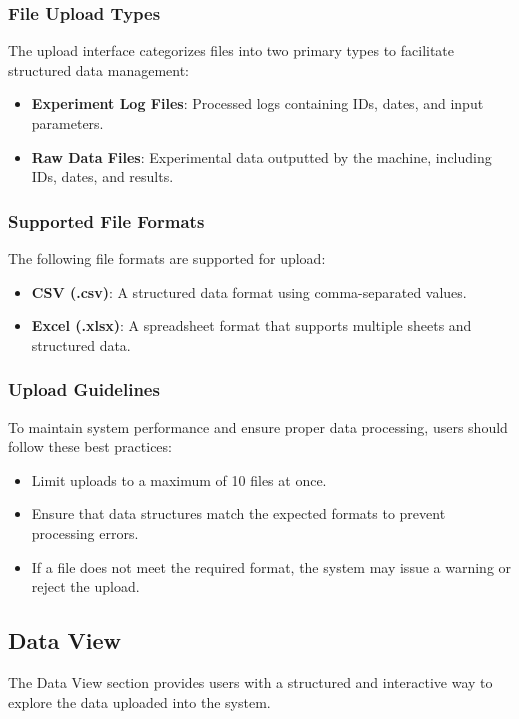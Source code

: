 \documentclass[12pt]{article}
\begin{document}
\subsubsection{File Upload Types}
The upload interface categorizes files into two primary types to facilitate
structured data management:
\begin{itemize}
    \item \textbf{Experiment Log Files}: Processed logs containing IDs, dates,
    and input parameters.
    \item \textbf{Raw Data Files}: Experimental data outputted by the machine,
    including IDs, dates, and results.
\end{itemize}

\subsubsection{Supported File Formats}
The following file formats are supported for upload:
\begin{itemize}
    \item \textbf{CSV (.csv)}: A structured data format using comma-separated
    values.
    \item \textbf{Excel (.xlsx)}: A spreadsheet format that supports multiple
    sheets and structured data.
\end{itemize}

\subsubsection{Upload Guidelines}
To maintain system performance and ensure proper data processing, users should
follow these best practices:
\begin{itemize}
    \item Limit uploads to a maximum of 10 files at once.
    \item Ensure that data structures match the expected formats to prevent
    processing errors.
    \item If a file does not meet the required format, the system may issue a
    warning or reject the upload.
\end{itemize}


\subsection{Data View}

The Data View section provides users with a structured and interactive way to
explore the data uploaded into the system. 
\end{document}
